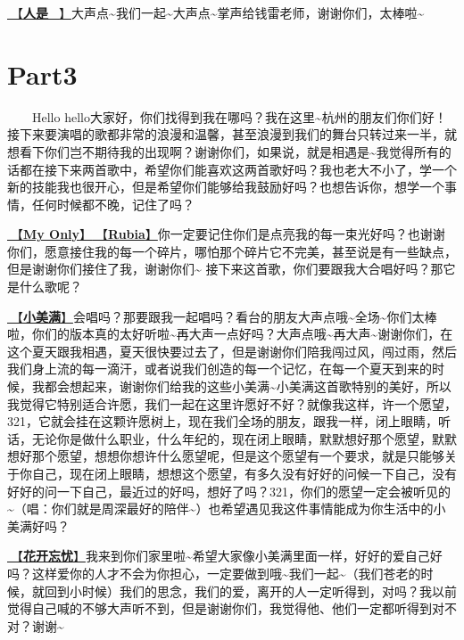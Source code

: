 \documentclass[]{ctexbook}
\begin{document}
\hyperref[renshi]{🎵【\textbf{人是\_}】}大声点\textasciitilde 我们一起\textasciitilde 大声点\textasciitilde 掌声给钱雷老师，谢谢你们，太棒啦\textasciitilde{}

\section{Part3}\label{hangzhou-20240823-part3}

  Hello hello大家好，你们找得到我在哪吗？我在这里\textasciitilde 杭州的朋友们你们好！接下来要演唱的歌都非常的浪漫和温馨，甚至浪漫到我们的舞台只转过来一半，就想看下你们岂不期待我的出现啊？谢谢你们，如果说，就是相遇是\textasciitilde 我觉得所有的话都在接下来两首歌中，希望你们能喜欢这两首歌好吗？我也老大不小了，学一个新的技能我也很开心，但是希望你们能够给我鼓励好吗？也想告诉你，想学一个事情，任何时候都不晚，记住了吗？

\hyperref[my-only]{🎵【\textbf{My Only}】}\hyperref[rubia]{🎵【\textbf{Rubia}】}你一定要记住你们是点亮我的每一束光好吗？也谢谢你们，愿意接住我的每一个碎片，哪怕那个碎片它不完美，甚至说是有一些缺点，但是谢谢你们接住了我，谢谢你们\textasciitilde{}
接下来这首歌，你们要跟我大合唱好吗？那它是什么歌呢？

\hyperref[happy-ending]{🎵【\textbf{小美满}】}会唱吗？那要跟我一起唱吗？看台的朋友大声点哦\textasciitilde 全场\textasciitilde 你们太棒啦，你们的版本真的太好听啦\textasciitilde 再大声一点好吗？大声点哦\textasciitilde 再大声\textasciitilde 谢谢你们，在这个夏天跟我相遇，夏天很快要过去了，但是谢谢你们陪我闯过风，闯过雨，然后我们身上流的每一滴汗，或者说我们创造的每一个记忆，在每一个夏天到来的时候，我都会想起来，谢谢你们给我的这些小美满\textasciitilde 小美满这首歌特别的美好，所以我觉得它特别适合许愿，我们一起在这里许愿好不好？就像我这样，许一个愿望，321，它就会挂在这颗许愿树上，现在我们全场的朋友，跟我一样，闭上眼睛，听话，无论你是做什么职业，什么年纪的，现在闭上眼睛，默默想好那个愿望，默默想好那个愿望，想想你想许什么愿望呢，但是这个愿望有一个要求，就是只能够关于你自己，现在闭上眼睛，想想这个愿望，有多久没有好好的问候一下自己，没有好好的问一下自己，最近过的好吗，想好了吗？321，你们的愿望一定会被听见的\textasciitilde（唱：你们就是周深最好的陪伴\textasciitilde）也希望遇见我这件事情能成为你生活中的小美满好吗？

\hyperref[no-worries]{🎵【\textbf{花开忘忧}】}我来到你们家里啦\textasciitilde 希望大家像小美满里面一样，好好的爱自己好吗？这样爱你的人才不会为你担心，一定要做到哦\textasciitilde 我们一起\textasciitilde（我们苍老的时候，就回到小时候）我们的思念，我们的爱，离开的人一定听得到，对吗？我以前觉得自己喊的不够大声听不到，但是谢谢你们，我觉得他、他们一定都听得到对不对？谢谢\textasciitilde{}
\end{document}
